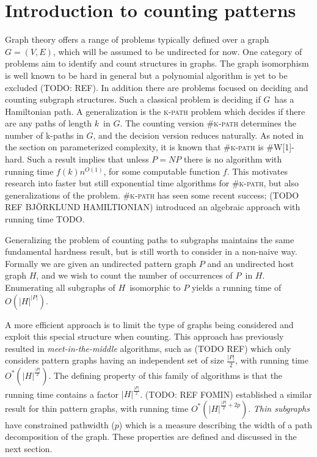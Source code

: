 \documentclass[a4paper,11pt]{report}
\theoremstyle{plain}
\theoremstyle{definition}
\begin{document}
\section{Introduction to counting patterns}
Graph theory offers a range of problems typically defined over a graph $G = (V, E)$, which will be assumed to be undirected for now.
One category of problems aim to identify and count structures in graphs.
The graph isomorphism is well known to be hard in general but a polynomial algorithm is yet to be excluded (TODO: REF).
In addition there are problems focused on deciding and counting subgraph structures.
Such a classical problem is deciding if $G$ has a Hamiltonian path.
A generalization is the \textsc{k-path} problem which decides if there are any paths of length $k$ in $G$.
The counting version \textsc{\#k-path} determines the number of k-paths in $G$, and the decision version reduces naturally.
As noted in the section on parameterized complexity, it is known that \textsc{\#k-path} is \textsc{\#W[1]}-hard.
Such a result implies that unless $P=NP$ there is no algorithm with running time $f(k)n^{O(1)}$, for some computable function $f$. %
This motivates research into faster but still exponential time algorithms for \textsc{\#k-path}, but also generalizations of the problem.
\textsc{\#k-path} has seen some recent success; (TODO REF BJÖRKLUND HAMILTIONIAN) introduced an algebraic approach with running time TODO.

Generalizing the problem of counting paths to subgraphs maintains the same fundamental hardness result, but is still worth to consider in a non-naive way.
Formally we are given an undirected pattern graph $P$ and an undirected host graph $H$, and we wish to count the number of occurrences of $P$ in $H$.
Enumerating all subgraphs of $H$ isomorphic to $P$ yields a running time of $O(|H|^{|P|})$.

A more efficient approach is to limit the type of graphs being considered and exploit this special structure when counting.
This approach has previously resulted in \emph{meet-in-the-middle} algorithms, such as (TODO REF) which only considers pattern graphs having an independent set of size $\frac{|P|}{2}$,
with running time $O^*(|H|^{\frac{|P|}{2}})$.
The defining property of this family of algorithms is that the running time contains a factor $|H|^{\frac{|P|}{2}}$.
(TODO: REF FOMIN) established a similar result for thin pattern graphs, with running time $O^*(|H|^{\frac{|P|}{2} + 2p})$.
\emph{Thin subgraphs} have constrained pathwidth ($p$) which is a measure describing the width of a path decomposition of the graph.
These properties are defined and discussed in the next section.
\end{document}
